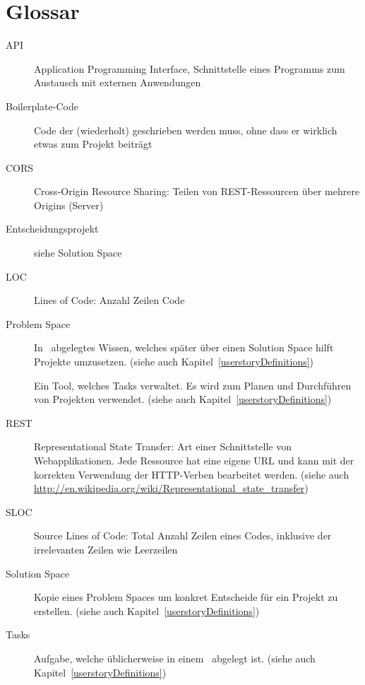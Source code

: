 \chapter{Glossar}
	\begin{description}
		\item[API]{Application Programming Interface, Schnittstelle eines Programms zum Austausch mit externen Anwendungen}
		\item[Boilerplate-Code]{Code der (wiederholt) geschrieben werden muss, ohne dass er wirklich etwas zum Projekt beiträgt}
		\item[CORS]{Cross-Origin Resource Sharing: Teilen von REST-Ressourcen über mehrere Origins (Server)}
		\item[Entscheidungsprojekt]{siehe Solution Space}
		\item[LOC]{Lines of Code: Anzahl Zeilen Code}
		\item[Problem Space]{In \cdar\ abgelegtes Wissen, welches später über einen Solution Space hilft Projekte umzusetzen. (siehe auch Kapitel~\ref{userstoryDefinitions})}
		\item[\ppt]{Ein Tool, welches Tasks verwaltet. Es wird zum Planen und Durchführen von Projekten verwendet. (siehe auch Kapitel~\ref{userstoryDefinitions})}
		\item[REST]{Representational State Transfer: Art einer Schnittstelle von Webapplikationen. Jede Ressource hat eine eigene URL und kann mit der korrekten Verwendung der HTTP-Verben bearbeitet werden. (siehe auch \url{http://en.wikipedia.org/wiki/Representational_state_transfer})}
		\item[SLOC]{Source Lines of Code: Total Anzahl Zeilen eines Codes, inklusive der irrelevanten Zeilen wie Leerzeilen}
		\item[Solution Space]{Kopie eines Problem Spaces um konkret Entscheide für ein Projekt zu erstellen. (siehe auch Kapitel~\ref{userstoryDefinitions})}
		\item[Tasks]{Aufgabe, welche üblicherweise in einem \ppt\ abgelegt ist. (siehe auch Kapitel~\ref{userstoryDefinitions})}

\end{description}
